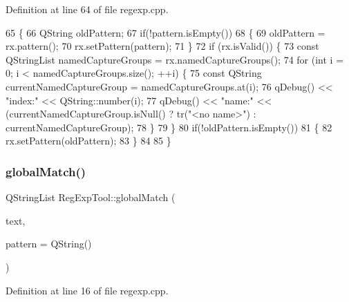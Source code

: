 Definition at line 64 of file regexp.\+cpp.


\begin{DoxyCode}
65 \{
66     QString oldPattern;
67     \textcolor{keywordflow}{if}(!pattern.isEmpty())
68     \{
69         oldPattern = rx.pattern();
70         rx.setPattern(pattern);
71     \}
72     \textcolor{keywordflow}{if} (rx.isValid()) \{
73         \textcolor{keyword}{const} QStringList namedCaptureGroups = rx.namedCaptureGroups();
74         \textcolor{keywordflow}{for} (\textcolor{keywordtype}{int} i = 0; i < namedCaptureGroups.size(); ++i) \{
75             \textcolor{keyword}{const} QString currentNamedCaptureGroup = namedCaptureGroups.at(i);
76             qDebug() << \textcolor{stringliteral}{"index:"} <<  QString::number(i);
77             qDebug() << \textcolor{stringliteral}{"name:"} << (currentNamedCaptureGroup.isNull() ? tr(\textcolor{stringliteral}{"<no name>"}) : 
      currentNamedCaptureGroup);
78         \}
79     \}
80     \textcolor{keywordflow}{if}(!oldPattern.isEmpty())
81     \{
82         rx.setPattern(oldPattern);
83     \}
84 
85 \}
\end{DoxyCode}
\mbox{\label{class_reg_exp_tool_a15bf497425b5baaebf81697af4e59ad2}} 
\subsubsection{\texorpdfstring{global\+Match()}{globalMatch()}}
{\footnotesize\ttfamily Q\+String\+List Reg\+Exp\+Tool\+::global\+Match (\begin{DoxyParamCaption}\item[{Q\+String}]{text,  }\item[{Q\+String}]{pattern = {\ttfamily QString()} }\end{DoxyParamCaption})}



Definition at line 16 of file regexp.\+cpp.


